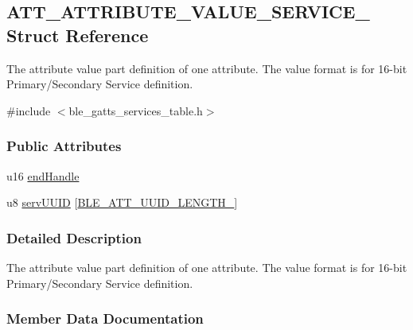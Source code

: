 \hypertarget{struct_a_t_t___a_t_t_r_i_b_u_t_e___v_a_l_u_e___s_e_r_v_i_c_e__2}{}\subsection{A\+T\+T\+\_\+\+A\+T\+T\+R\+I\+B\+U\+T\+E\+\_\+\+V\+A\+L\+U\+E\+\_\+\+S\+E\+R\+V\+I\+C\+E\+\_ Struct Reference}
\label{struct_a_t_t___a_t_t_r_i_b_u_t_e___v_a_l_u_e___s_e_r_v_i_c_e__2}


The attribute value part definition of one attribute. The value format is for 16-\/bit Primary/\+Secondary Service definition.  




{\ttfamily \#include $<$ble\+\_\+gatts\+\_\+services\+\_\+table.\+h$>$}

\subsubsection*{Public Attributes}
\begin{DoxyCompactItemize}
\item 
u16 \hyperlink{struct_a_t_t___a_t_t_r_i_b_u_t_e___v_a_l_u_e___s_e_r_v_i_c_e__2_a7772be846616f32e4828156d563c4b74}{end\+Handle}
\item 
u8 \hyperlink{struct_a_t_t___a_t_t_r_i_b_u_t_e___v_a_l_u_e___s_e_r_v_i_c_e__2_a09fc3ddabc7ff1e93b9f5b46a03d8966}{serv\+U\+U\+ID} \mbox{[}\hyperlink{group___b_l_e___a_t_t___u_u_i_d___l_e_n_g_t_h___t_y_p_e_s_gad9197bbabd94416a4a41891fb808dcf1}{B\+L\+E\+\_\+\+A\+T\+T\+\_\+\+U\+U\+I\+D\+\_\+\+L\+E\+N\+G\+T\+H\+\_}\mbox{]}
\end{DoxyCompactItemize}


\subsubsection{Detailed Description}
The attribute value part definition of one attribute. The value format is for 16-\/bit Primary/\+Secondary Service definition. 

\subsubsection{Member Data Documentation}
